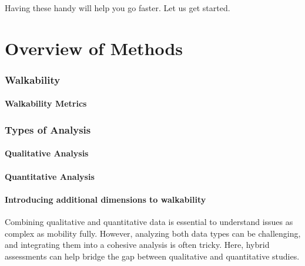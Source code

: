 \documentclass[
]{latex/krantz}
\begin{document}
Having these handy will help you go faster. Let us get started.

\hypertarget{part-overview-of-methods}{%
\part{Overview of Methods}\label{part-overview-of-methods}}

\hypertarget{walkability}{%
\section{Walkability}\label{walkability}}

\hypertarget{walkability-metrics}{%
\subsection{Walkability Metrics}\label{walkability-metrics}}

\hypertarget{types-of-analysis}{%
\section{Types of Analysis}\label{types-of-analysis}}

\hypertarget{qualitative-analysis}{%
\subsection{Qualitative Analysis}\label{qualitative-analysis}}

\hypertarget{quantitative-analysis}{%
\subsection{Quantitative Analysis}\label{quantitative-analysis}}

\hypertarget{introducing-additional-dimensions-to-walkability}{%
\subsection{Introducing additional dimensions to walkability}\label{introducing-additional-dimensions-to-walkability}}

Combining qualitative and quantitative data is essential to understand issues as complex as mobility fully. However, analyzing both data types can be challenging, and integrating them into a cohesive analysis is often tricky. Here, hybrid assessments can help bridge the gap between qualitative and quantitative studies.
\end{document}
